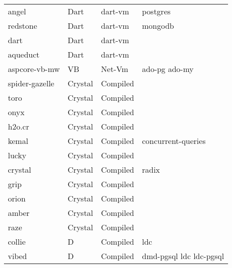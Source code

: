 \begin{longtable}{llll}
    angel            & Dart        & dart-vm     & postgres                                           \\
    redstone         & Dart        & dart-vm     & mongodb                                            \\
    dart             & Dart        & dart-vm     &                                                    \\
    aqueduct         & Dart        & dart-vm     &                                                    \\
    aspcore-vb-mw    & VB          & Net-Vm      & ado-pg ado-my                                      \\
    spider-gazelle   & Crystal     & Compiled    &                                                    \\
    toro             & Crystal     & Compiled    &                                                    \\
    onyx             & Crystal     & Compiled    &                                                    \\
    h2o.cr           & Crystal     & Compiled    &                                                    \\
    kemal            & Crystal     & Compiled    & concurrent-queries                                 \\
    lucky            & Crystal     & Compiled    &                                                    \\
    crystal          & Crystal     & Compiled    & radix                                              \\
    grip             & Crystal     & Compiled    &                                                    \\
    orion            & Crystal     & Compiled    &                                                    \\
    amber            & Crystal     & Compiled    &                                                    \\
    raze             & Crystal     & Compiled    &                                                    \\
    collie           & D           & Compiled    & ldc                                                \\
    vibed            & D           & Compiled    & dmd-pgsql ldc ldc-pgsql                            \\

\end{longtable}
